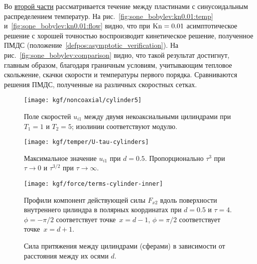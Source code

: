 Во \underline{второй части} рассматривается течение между пластинами с синусоидальным распределением температур.
На рис.~\ref{fig:sone_bobylev:kn0.01:temp} и~\ref{fig:sone_bobylev:kn0.01:flow} видно,
что при \(\mathrm{Kn}=0.01\) асимптотическое решение с хорошей точностью воспроизводит кинетическое решение,
полученное ПМДС (положение~\ref{defpos:asymptotic_verification}).
На рис.~\ref{fig:sone_bobylev:comparison} видно, что такой результат достигнут, главным образом,
благодаря граничным условиям, учитывающим тепловое скольжение, скачки скорости и температуры первого порядка.
Сравниваются решения ПМДС, полученные на различных скоростных сетках.


\begin{figure}
    \centering
    \texttt{[image: kgf/noncoaxial/cylinder5]}
    \caption{Поле скоростей \(u_{i1}\) между двумя некоаксиальными цилиндрами при \(T_1=1\) и \(T_2=5\);
        изолинии соответствуют модулю.}
    \label{fig:cylinders:velocity}
\end{figure}

\begin{figure}
    \centering
    \begin{minipage}{.48\textwidth}
        \texttt{[image: kgf/temper/U-tau-cylinders]}
        \caption{Максимальное значение \(u_{i1}\) при \(d=0.5\).
            Пропорционально \(\tau^3\) при \(\tau\to0\) и \(\tau^{3/2}\) при \(\tau\to\infty\).}
        \label{fig:cylinders:maxU}
    \end{minipage}
    \hfill
    \begin{minipage}{.48\textwidth}
        \texttt{[image: kgf/force/terms-cylinder-inner]}
        \caption{Профили компонент действующей силы \(F_{x2}\) вдоль поверхности внутреннего цилиндра
            в полярных координатах при \(d=0.5\) и \(\tau=4\).
            \(\phi = -\pi/2\) соответствует точке~\(x=d-1\), \(\phi = \pi/2\) соответствует точке~\(x=d+1\).}
        \label{fig:cylinders:terms_inner}
    \end{minipage}
\end{figure}

\begin{figure}
    \centering
    \caption{Сила притяжения между цилиндрами (сферами) в зависимости от расстояния между их осями \(d\).}
    \label{fig:cylinders:force}
\end{figure}

